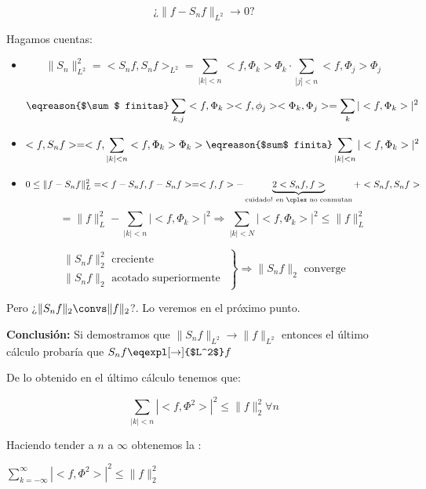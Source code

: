 		\[ \text{¿} \| f - S_n f \|_{L^2} \rightarrow 0 \text{?}\]

		Hagamos cuentas:

		\begin{itemize}

			\item
			\[ \|S_n\|_{L^2}^2 = < S_n f, S_n f>_{L^2} = \sum_{|k| < n} <f, \Phi_k> \Phi_k \cdot \sum_{|j| < n} <f, \Phi_j> \Phi_j \]

			\[ \eqreason{$\sum$ finitas} \sum_{k,j} <f, \Phi_k><f, \phi_j><\Phi_k, \Phi_j> = \sum_k | <f, \Phi_k> |^2
			\]


			\item
			\[
				<f, S_n f> = <f, \sum_{|k| < n} <f, \Phi_k> \Phi_k > \eqreason{$sum$ finita} \sum_{|k| < n} | <f, \Phi_k> |^2
			\]

			\item
			\[
				0 \leq \|f - S_n f\|^2_{L} = <f - S_n f, f- S_n f> = <f,f> - \underbrace{2 <S_n f, f>}_{\text{cuidado! en }\cplex\text{ no conmutan}} + <S_n f, S_n f>
			\]
			\[ = \|f\|_{L}^2 - \sum_{|k| < n} |<f, \Phi_k>|^2 \Rightarrow \sum_{|k| < N} |<f, \Phi_k>|^2 \leq \|f\|_L^2 \]


		\end{itemize}

		\obs  \[
			\left.
			\begin{array}{l}
				\|S_n f\|^2_2 \text{ creciente } \\
				\|S_n f\|_2 \text{ acotado superiormente }
			\end{array}
			\right\} \Rightarrow \|S_n f\|_{2} \text{ converge }
		\]

		Pero ¿$\|S_n f\|_2 \convs \| f \|_2$?. Lo veremos en el próximo punto.

		\textbf{Conclusión:} Si demostramos que  $\|S_n f\|_{L^2} \rightarrow \| f \|_{L^2}$ entonces el último cálculo probaría que $S_n f \eqexpl[\rightarrow]{$L^2$} f$

		\obs De lo obtenido en el último cálculo tenemos que:

			\[ \sum_{|k| < n} |<f, \Phi^2>|^2 \leq \|f\|_2^2 \forall n \]

			Haciendo tender a $n$ a $\infty$ obtenemos la :

			\( \sum_{k=-\infty}^\infty |<f, \Phi^2>|^2 \leq \|f\|_2^2 \label{eq:desigualdad_bessel}  \)

